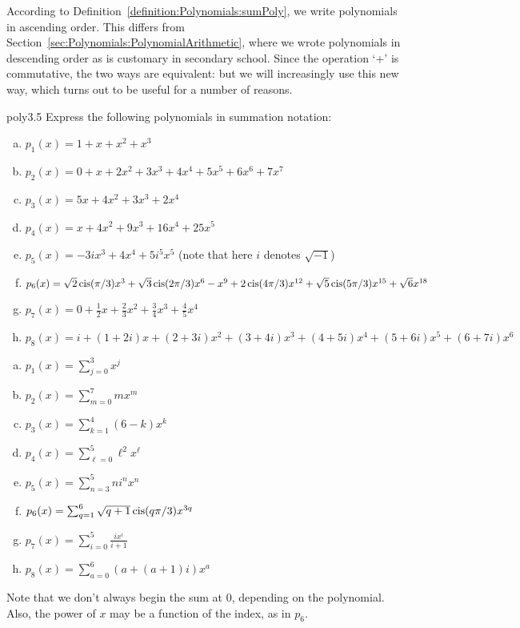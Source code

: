 \begin{rem}
According to  Definition~\ref{definition:Polynomials:sumPoly}, we write polynomials in ascending order. This differs from Section~\ref{sec:Polynomials:PolynomialArithmetic}, where we wrote polynomials in descending order as is customary in secondary school. Since the operation `+'  is commutative, the two ways are equivalent: but we will increasingly use this new way, which turns out to be useful for a number of reasons. 
\end{rem}

 \begin{example}{poly3.5} Express the following polynomials in summation notation:
\begin{enumerate}[(a)]
\item
$p_1(x)=1 + x+x^2+x^3$
\item
$p_2(x)=0 + x+2x^2+3x^3+4x^4+5x^5+6x^6+7x^7$
\item
$p_3(x)=5 x+4x^2+3x^3+2x^4 $
\item
$p_4(x)=x+4x^2+9x^3+16x^4+25x^5$
\item
$p_5(x)=-3ix^3+4x^4+5i^5x^5$ (note that here $i$ denotes $\sqrt{-1}$)
\item
$p_6(x)=\sqrt{2}\operatorname{cis}(\pi/3)x^3+\sqrt{3}\operatorname{cis}(2\pi/3)x^6-x^9 + 2\operatorname{cis}(4\pi/3)x^{12} + \sqrt{5}\operatorname{cis}(5\pi/3)x^{15} + \sqrt{6}x^{18}$ 
\item
$p_7(x)=0+\frac{1}{2}x+\frac{2}{3}x^2+\frac{3}{4}x^3+\frac{4}{5}x^4$
\item
$p_8(x)=i+(1+2i)x+(2+3i)x^2+(3+4i)x^3+(4+5i)x^4+(5+6i)x^5+(6+7i)x^6$
\end{enumerate}
 

\begin{enumerate}[(a)]
\item
$p_1(x)  = \sum_{j=0}^{3} x^j$
\item
$p_2(x)=\sum_{m=0}^{7} mx^m$
\item
$p_3(x)=\sum_{k=1}^{4} (6-k)x^k $
\item
$p_4(x)=\sum_{\ell=0}^{5} \ell^2x^\ell$
\item
$p_5(x)  = \sum_{n=3}^{5}ni^nx^n$
\item
$p_6(x) = \sum_{q=1}^{6}\sqrt{q+1}\operatorname{cis}(q\pi/3)x^{3q}$
\item
$p_7(x) = \sum_{i=0}^{5}\frac{ix^i}{i+1}$
\item
$p_8(x) = \sum_{a=0}^{6}(a+(a+1)i)x^a$
\end{enumerate}

Note that we don't always begin the sum at 0, depending on the polynomial. Also, the power of $x$ may be a function of the index, as in $p_6$.

\end{example}


